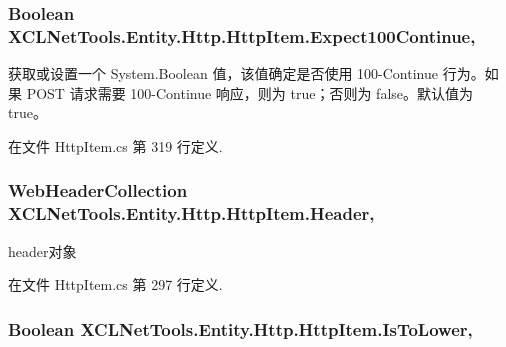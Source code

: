 \hypertarget{class_x_c_l_net_tools_1_1_entity_1_1_http_1_1_http_item_a378c7e8a43937807df263b1985c3b945}{
\subsubsection[{Expect100\-Continue}]{\setlength{\rightskip}{0pt plus 5cm}Boolean X\-C\-L\-Net\-Tools.\-Entity.\-Http.\-Http\-Item.\-Expect100\-Continue\hspace{0.3cm}{\ttfamily [get]}, {\ttfamily [set]}}}\label{class_x_c_l_net_tools_1_1_entity_1_1_http_1_1_http_item_a378c7e8a43937807df263b1985c3b945}


获取或设置一个 System.\-Boolean 值，该值确定是否使用 100-\/\-Continue 行为。如果 P\-O\-S\-T 请求需要 100-\/\-Continue 响应，则为 true；否则为 false。默认值为 true。 



在文件 Http\-Item.\-cs 第 319 行定义.

\hypertarget{class_x_c_l_net_tools_1_1_entity_1_1_http_1_1_http_item_a803ddfa9179e1ad325783327db8273ac}{
\subsubsection[{Header}]{\setlength{\rightskip}{0pt plus 5cm}Web\-Header\-Collection X\-C\-L\-Net\-Tools.\-Entity.\-Http.\-Http\-Item.\-Header\hspace{0.3cm}{\ttfamily [get]}, {\ttfamily [set]}}}\label{class_x_c_l_net_tools_1_1_entity_1_1_http_1_1_http_item_a803ddfa9179e1ad325783327db8273ac}


header对象 



在文件 Http\-Item.\-cs 第 297 行定义.

\hypertarget{class_x_c_l_net_tools_1_1_entity_1_1_http_1_1_http_item_a8b9e3149b03e7ca279e247817a2ef205}{
\subsubsection[{Is\-To\-Lower}]{\setlength{\rightskip}{0pt plus 5cm}Boolean X\-C\-L\-Net\-Tools.\-Entity.\-Http.\-Http\-Item.\-Is\-To\-Lower\hspace{0.3cm}{\ttfamily [get]}, {\ttfamily [set]}}}\label{class_x_c_l_net_tools_1_1_entity_1_1_http_1_1_http_item_a8b9e3149b03e7ca279e247817a2ef205}


